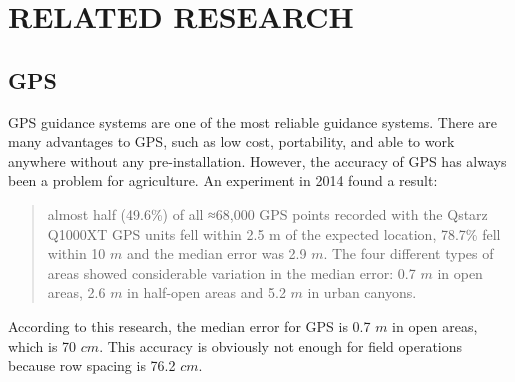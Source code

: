 \chapter{RELATED RESEARCH}

\section{GPS}
GPS guidance systems are one of the most reliable guidance systems. There are many advantages to GPS, such as low cost, portability, and able to work anywhere without any pre-installation. However, the accuracy of GPS has always been a problem for agriculture. An experiment in 2014 found a result: 
\begin{quote}
almost half (49.6\%) of all ≈68,000 GPS points recorded with the Qstarz Q1000XT GPS units fell within 2.5 m of the expected location, 78.7\% fell within 10 $m$ and the median error was 2.9 $m$. The four different types of areas showed considerable variation in the median error: 0.7 $m$ in open areas, 2.6 $m$ in half-open areas and 5.2 $m$ in urban canyons. \cite{schipperijn2014dynamic}
\end{quote}
According to this research, the median error for GPS is 0.7 $m$ in open areas, which is 70 $cm$. This accuracy is obviously not enough for field operations because row spacing is 76.2 $cm$.

